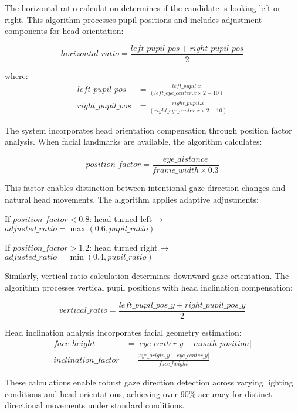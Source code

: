 \documentclass[conference]{IEEEtran}
\begin{document}
The horizontal ratio calculation determines if the candidate is looking left or right. This algorithm processes pupil positions and includes adjustment components for head orientation:

\begin{equation}
horizontal\_ratio = \frac{left\_pupil\_pos + right\_pupil\_pos}{2}
\end{equation}

where:
\begin{align}
left\_pupil\_pos &= \frac{left\_pupil.x}{(left\_eye\_center.x \times 2 - 10)} \\
right\_pupil\_pos &= \frac{right\_pupil.x}{(right\_eye\_center.x \times 2 - 10)}
\end{align}

The system incorporates head orientation compensation through position factor analysis. When facial landmarks are available, the algorithm calculates:

\begin{equation}
position\_factor = \frac{eye\_distance}{frame\_width \times 0.3}
\end{equation}

This factor enables distinction between intentional gaze direction changes and natural head movements. The algorithm applies adaptive adjustments:

If $position\_factor < 0.8$: head turned left → $adjusted\_ratio = \max(0.6, pupil\_ratio)$  

If $position\_factor > 1.2$: head turned right → $adjusted\_ratio = \min(0.4, pupil\_ratio)$

Similarly, vertical ratio calculation determines downward gaze orientation. The algorithm processes vertical pupil positions with head inclination compensation:

\begin{equation}
vertical\_ratio = \frac{left\_pupil\_pos\_y + right\_pupil\_pos\_y}{2}
\end{equation}

Head inclination analysis incorporates facial geometry estimation:
\begin{align}
face\_height &= |eye\_center\_y - mouth\_position| \\
inclination\_factor &= \frac{|eye\_origin\_y - eye\_center\_y|}{face\_height}
\end{align}

These calculations enable robust gaze direction detection across varying lighting conditions and head orientations, achieving over 90\% accuracy for distinct directional movements under standard conditions.
\end{document}
